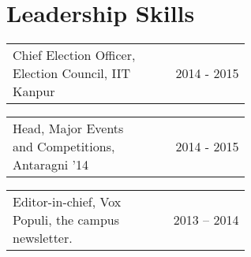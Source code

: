 \documentclass[a4paper]{article} %
\newcommand{\verticalspacing}{-0.25cm}
\newcommand{\headspace}{-0.3cm}
\newcommand{\bulletspace}{0.7cm}
\newcommand{\projectheadspacing}{6.9cm}
\newcommand{\gitproject}[3]{%
    \begin{tabular}{p{0.60\linewidth}r}
        \textcolor{NavyBlue}{\small #2} & \multicolumn{1}{m{ \projectheadspacing{} }}{\raggedleft #1}\\
    \end{tabular}\\
    \begin{tabular}{p{0.98\linewidth}}
        \vspace{\headspace{}}
        \small{#3}
    \end{tabular}
    \vspace{\verticalspacing{}}
    \vspace{-0.2cm} %
}
\newcommand{\skill}[2]{%
    \begin{tabular}{p{0.60\linewidth}r}
        \small {#2} & \multicolumn{1}{m{ \projectheadspacing{} }}{\raggedleft \textsc{\small #1}}\\
    \end{tabular}
    \vspace{\verticalspacing{}}
}
\begin{document}
\section {Leadership Skills}

\skill
    {2014 - 2015}
    {Chief Election Officer, Election Council, IIT Kanpur}

\skill
    {2014 - 2015}
    {Head, Major Events and Competitions, Antaragni '14}


\skill
    {2013 -- 2014}
    {Editor-in-chief, Vox Populi, the campus newsletter.}


\end{document}
